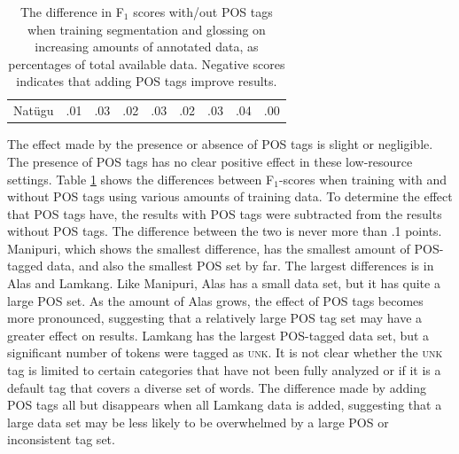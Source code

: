 \begin{table}
\begin{tabular}{l|cccccccc}
       Nat\"ugu & .01 & .03 & .02 & .03 & .02 & .03 & .04 & .00 \\
    \end{tabular}
    \caption[Segmenting and Glossing with/out POS tags]{The difference in F$_1$ scores with/out POS tags when training segmentation and glossing on increasing amounts of annotated data, as percentages of total available data. Negative scores indicates that adding POS tags improve results.
    }
    \label{tab:POSSG}
\end{table}


The effect made by the presence or absence of POS tags is slight or negligible. The presence of POS tags has no clear positive effect in these low-resource settings. Table \ref{tab:POSSG} shows the differences between F$_1$-scores when training with and without POS tags using various amounts of training data. To determine the effect that POS tags have, the results with POS tags were subtracted from the results without POS tags. The difference between the two is never more than .1 points. Manipuri, which shows the smallest difference, has the smallest amount of POS-tagged data, and also the smallest POS set by far. The largest differences is in Alas and Lamkang. Like Manipuri, Alas has a small data set, but it has quite a large POS set. As the amount of Alas grows, the effect of POS tags becomes more pronounced, suggesting that a relatively large POS tag set may have a greater effect on results. Lamkang has the largest POS-tagged data set, but a significant number of tokens were tagged as \textsc{unk}. It is not clear whether the \textsc{unk} tag is limited to certain categories that have not been fully analyzed or if it is a default tag that covers a diverse set of words. The difference made by adding POS tags all but disappears when all Lamkang data is added, suggesting that a large data set may be less likely to be overwhelmed by a large POS or inconsistent tag set.


